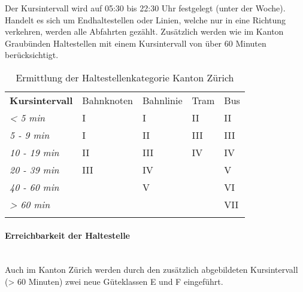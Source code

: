 Der Kursintervall wird auf 05:30 bis 22:30 Uhr festgelegt (unter der Woche).
Handelt es sich um Endhaltestellen oder Linien, welche nur in eine Richtung verkehren, werden alle Abfahrten gezählt.
Zusätzlich werden wie im Kanton Graubünden  Haltestellen mit einem Kursintervall von über 60 Minuten berücksichtigt.

\begin{longtable}[c]{l p{2.9cm} p{2.8cm} p{2.8cm} p{2.8cm}}
        \midrule
        \textbf{Kursintervall}
                                & Bahnknoten
                                & Bahnlinie
                                & Tram
                                & Bus\\
        \textit{< 5 min}
                                & I
                                & I
                                & II
                                & II\\
        \textit{5 - 9 min}
                                & I
                                & II
                                & III
                                & III\\
        \textit{10 - 19 min}
                                & II
                                & III
                                & IV
                                & IV\\
        \textit{20 - 39 min}
                                & III
                                & IV
                                &
                                & V\\
        \textit{40 - 60 min}
                                &
                                & V
                                &
                                & VI\\
        \cellcolor{red!25}\textit{> 60 min}
                                &
                                &
                                &
                                & \cellcolor{red!25}VII\\
        \bottomrule
    \caption{Ermittlung der Haltestellenkategorie Kanton Zürich}
    \label{table:Ermittlung der Haltestellenkategorie Kanton Zürich}
\end{longtable}


\paragraph{Erreichbarkeit der Haltestelle}~\\
\label{Berechnungsmethodik Kanton Zürich:Erreichbarkeit der Haltestelle}
Auch im Kanton Zürich werden durch den zusätzlich abgebildeten Kursintervall (> 60 Minuten) zwei neue Güteklassen E und F eingeführt.

